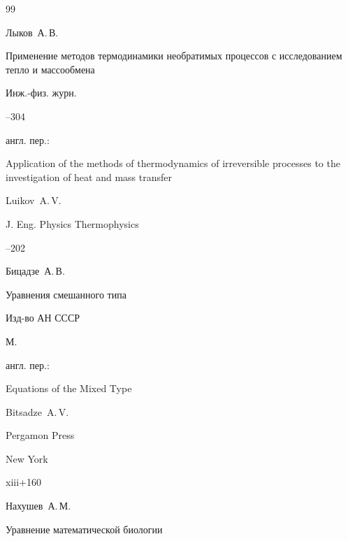 \pagebreak






\begin{thebibliography}{99}




\by Лыков~А.\,В.

\paper Применение методов термодинамики необратимых процессов с исследованием тепло и массообмена 

\jour Инж.-физ. журн.

--304




\transl англ. пер.:~

\paper Application of the methods of thermodynamics of irreversible processes to the investigation of heat and mass transfer

\by Luikov~A.\,V.


\jour J. Eng. Physics Thermophysics




--202




\by Бицадзе~А.\,В.

\book Уравнения смешанного типа 

\publ Изд-во АН СССР

\publaddr М.



\transl \mbox{англ.} пер.:~

\book Equations of the Mixed Type

\by Bitsadze~A.\,V.

\publ Pergamon Press

\publaddr New York


\totalpages xiii+160




\by Нахушев~А.\,М.

\book Уравнение математической биологии 


\end{thebibliography}
